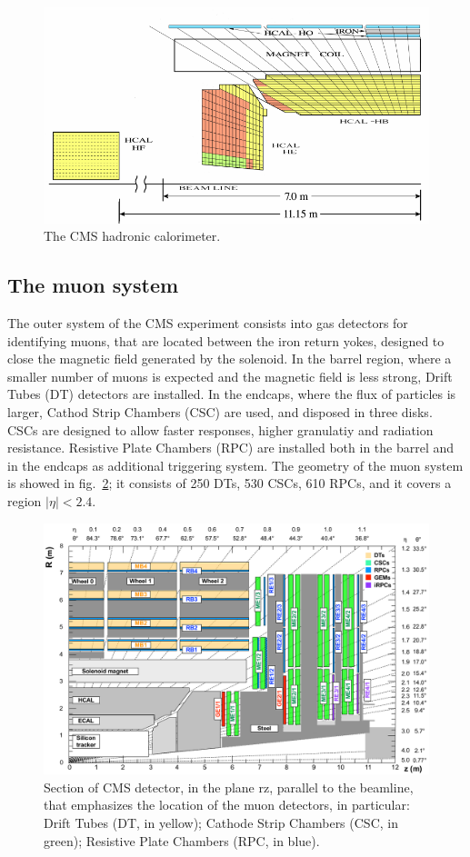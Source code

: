\begin{figure}[!htb]
  \centering
    \includegraphics[width=.7\textwidth]{figures/cmshcal.png}
  \caption{The CMS hadronic calorimeter.}
  \label{fig:CMS_hcal}
\end{figure}


\subsection{The muon system}


The outer system of the CMS experiment consists into gas detectors for identifying muons, that are located between the iron return yokes, designed to close the magnetic field generated by the solenoid. In the barrel region, where a smaller number of muons is expected and the magnetic field is less strong, Drift Tubes (DT) detectors are installed. In the endcaps, where the flux of particles is larger, Cathod Strip Chambers (CSC) are used, and disposed in three disks. CSCs are designed to allow faster responses, higher granulatiy and radiation resistance. Resistive Plate Chambers (RPC) are installed both in the barrel and in the endcaps as additional triggering system. The geometry of the muon system is showed in fig.~\ref{fig:CMS_muon}; it consists of 250 DTs, 530 CSCs, 610 RPCs, and it covers a region $|\eta|<2.4$.

\begin{figure}[!htb]
  \centering
    \includegraphics[width=.9\textwidth]{figures/cmsmuon.png}
  \caption{Section of CMS detector, in the plane $\mathrm{rz}$, parallel to the beamline, that emphasizes the location of the muon detectors, in particular: Drift Tubes (DT, in yellow); Cathode Strip Chambers (CSC, in green); Resistive Plate Chambers (RPC, in blue).}
  \label{fig:CMS_muon}
\end{figure}



